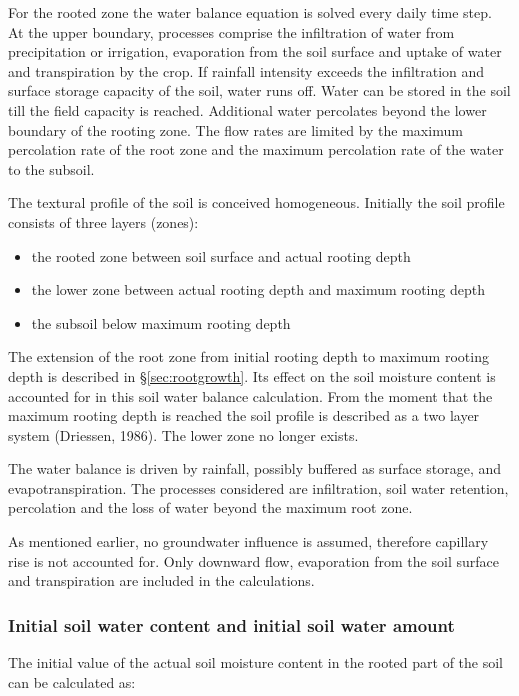 For the rooted zone the water balance equation is solved every daily time step. At the
upper boundary, processes comprise the infiltration of water from precipitation or
irrigation, evaporation from the soil surface and uptake of water and transpiration by the
crop. If rainfall intensity exceeds the infiltration and surface storage capacity of the soil,
water runs off. Water can be stored in the soil till the field capacity is reached. Additional
water percolates beyond the lower boundary of the rooting zone.
The flow rates are limited by the maximum percolation rate of the root zone and the
maximum percolation rate of the water to the subsoil.

The textural profile of the soil is conceived homogeneous. Initially the soil profile
consists of three layers (zones):
\begin{itemize}
	\item the rooted zone between soil surface and actual rooting depth
	\item the lower zone between actual rooting depth and maximum rooting depth
	\item the subsoil below maximum rooting depth
\end{itemize}

The extension of the root zone from initial rooting depth to maximum rooting depth is
described in \S \ref{sec:rootgrowth}. Its effect on the soil moisture content is accounted 
for in this soil water
balance calculation. From the moment that the maximum rooting depth is reached the soil
profile is described as a two layer system (Driessen, 1986). The lower zone no longer
exists.

The water balance is driven by rainfall, possibly buffered as surface storage, and
evapotranspiration. The processes considered are infiltration, soil water retention,
percolation and the loss of water beyond the maximum root zone.

As mentioned earlier, no groundwater influence is assumed, therefore capillary rise is not
accounted for. Only downward flow, evaporation from the soil surface and transpiration
are included in the calculations. 

\subsubsection{Initial soil water content and initial soil water amount}

The initial value of the actual soil moisture content in the rooted part of the soil can be
calculated as:

